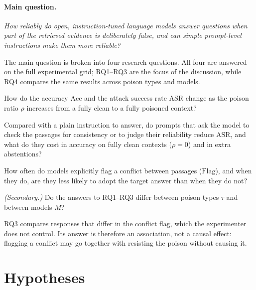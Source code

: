 \documentclass[11pt,a4paper]{report}
\begin{document}
\paragraph{Main question.}
\emph{How reliably do open, instruction-tuned language models answer
questions when part of the retrieved evidence is deliberately false, and
can simple prompt-level instructions make them more reliable?}

The main question is broken into four research questions. All four are
answered on the full experimental grid; RQ1--RQ3 are the focus of the
discussion, while RQ4 compares the same results across poison types and
models.

\begin{description}[leftmargin=0pt]
  \item[RQ1 --- Robustness to poison.] How do the accuracy
    $\mathrm{Acc}$ and the attack success rate $\mathrm{ASR}$ change as
    the poison ratio $\rho$ increases from a fully clean to a fully
    poisoned context?

  \item[RQ2 --- Effect of meta-prompts.] Compared with a plain
    instruction to answer, do prompts that ask the model to check the
    passages for consistency or to judge their reliability reduce
    $\mathrm{ASR}$, and what do they cost in accuracy on fully clean
    contexts ($\rho = 0$) and in extra abstentions?

  \item[RQ3 --- Conflict awareness.] How often do models explicitly
    flag a conflict between passages ($\mathrm{Flag}$), and when they do,
    are they less likely to adopt the target answer than when they do
    not?

  \item[RQ4 --- Poison types and models.] \emph{(Secondary.)} Do the
    answers to RQ1--RQ3 differ between poison types $\tau$ and between
    models $M$?
\end{description}

\begin{notebox}
RQ3 compares responses that differ in the conflict flag, which the
experimenter does not control. Its answer is therefore an association,
not a causal effect: flagging a conflict may go together with resisting
the poison without causing it.
\end{notebox}


\section{Hypotheses}\label{sec:hypotheses}
\end{document}
